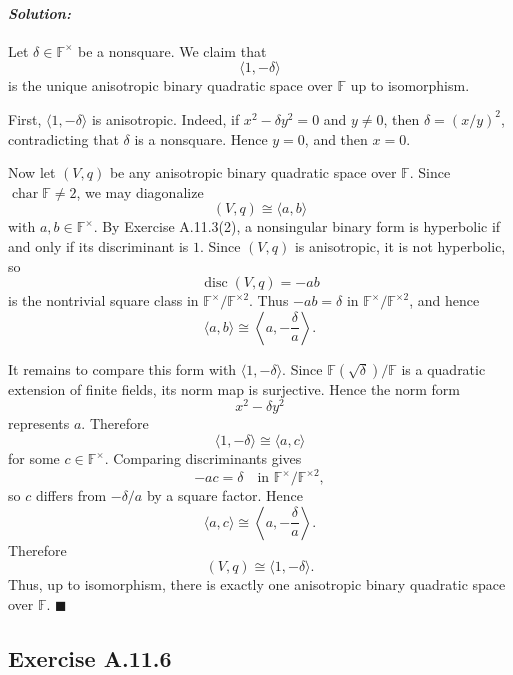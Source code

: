 \documentclass[12pt, a4paper]{article}
\newenvironment{solution}
  {\paragraph{\textit{Solution:}}\par\medskip}
  {\hfill$\blacksquare$\vspace{0.1cm}}
\begin{document}
\begin{solution}

Let $\delta\in \mathbb F^\times$ be a nonsquare. We claim that
\[
\langle 1,-\delta\rangle
\]
is the unique anisotropic binary quadratic space over $\mathbb F$ up to
isomorphism.

First, $\langle 1,-\delta\rangle$ is anisotropic. Indeed, if
$x^2-\delta y^2=0$ and $y\neq 0$, then $\delta=(x/y)^2$, contradicting that
$\delta$ is a nonsquare. Hence $y=0$, and then $x=0$.

Now let $(V,q)$ be any anisotropic binary quadratic space over $\mathbb F$.
Since $\operatorname{char}\mathbb F\neq 2$, we may diagonalize
\[
(V,q)\cong \langle a,b\rangle
\]
with $a,b\in \mathbb F^\times$. By Exercise A.11.3(2), a nonsingular binary
form is hyperbolic if and only if its discriminant is $1$. Since $(V,q)$ is
anisotropic, it is not hyperbolic, so
\[
\operatorname{disc}(V,q)=-ab
\]
is the nontrivial square class in $\mathbb F^\times/\mathbb F^{\times 2}$.
Thus $-ab=\delta$ in $\mathbb F^\times/\mathbb F^{\times 2}$, and hence
\[
\langle a,b\rangle \cong \left\langle a,-\frac{\delta}{a}\right\rangle .
\]

It remains to compare this form with $\langle 1,-\delta\rangle$. Since
$\mathbb F(\sqrt{\delta})/\mathbb F$ is a quadratic extension of finite fields,
its norm map is surjective. Hence the norm form
\[
x^2-\delta y^2
\]
represents $a$. Therefore
\[
\langle 1,-\delta\rangle \cong \langle a,c\rangle
\]
for some $c\in\mathbb F^\times$. Comparing discriminants gives
\[
-ac=\delta \quad \text{in } \mathbb F^\times/\mathbb F^{\times 2},
\]
so $c$ differs from $-\delta/a$ by a square factor. Hence
\[
\langle a,c\rangle \cong \left\langle a,-\frac{\delta}{a}\right\rangle .
\]
Therefore
\[
(V,q)\cong \langle 1,-\delta\rangle .
\]
Thus, up to isomorphism, there is exactly one anisotropic binary quadratic
space over $\mathbb F$.
\end{solution}

\subsection*{Exercise A.11.6}
\end{document}
